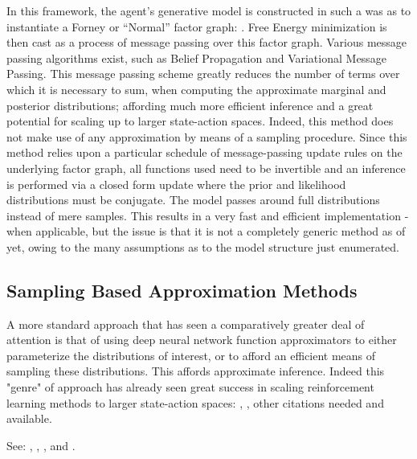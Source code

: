 \documentclass[onecolumn]{IEEEtran}
\begin{document}
In this framework, the agent's generative model is constructed in such a was as to instantiate a Forney or ``Normal'' factor graph: \textcite{Codes-on-Graphs}. Free Energy minimization is then cast as a process of message passing over this factor graph. Various message passing algorithms exist, such as Belief Propagation and Variational Message Passing. This message passing scheme greatly reduces the number of terms over which it is necessary to sum, when computing the approximate marginal and posterior distributions; affording much more efficient inference and a great potential for scaling up to larger state-action spaces. Indeed, this method does not make use of any approximation by means of a sampling procedure. Since this method relies upon a particular schedule of message-passing update rules on the underlying factor graph, all functions used need to be invertible and an inference is performed via a closed form update where the prior and likelihood distributions must be conjugate. The model passes around full distributions instead of mere samples. This results in a very fast and efficient implementation - when applicable, but the issue is that it is not a completely generic method as of yet, owing to the many assumptions as to the model structure just enumerated. 

\subsection{Sampling Based Approximation Methods}

A more standard approach that has seen a comparatively greater deal of attention is that of using deep neural network function approximators to either parameterize the distributions of interest, or to afford an efficient means of sampling these distributions. This affords approximate inference. Indeed this "genre" of approach has already seen great success in scaling reinforcement learning methods to larger state-action spaces: \textcite{Async-Methods-Deep-RL}, \textcite{ATARI-Deep-RL}, other citations needed and available.

See: \textcite{Deep-AIF}, \textcite{Applications-of-FEP-Machine-Learning-Neuroscience}, \textcite{Deep-AIF-As-Var-Policy-Grad}, \textcite{Reinforcement-Learning-Through-AIF} and \textcite{Bayesian-Policy-Selection-Using-AIF}. 
\end{document}

